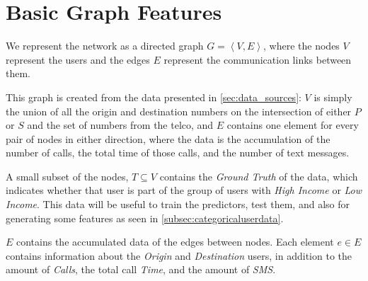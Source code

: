 \section{Basic Graph Features}
\label{sec:graphfeatures}

We represent the network as a directed graph $G = \left< V, E \right>$, where the nodes $V$ represent the users and the edges $E$ represent the communication links between them.

This graph is created from the data presented in \cref{sec:data_sources}: $V$ is simply the union of all the origin and destination numbers on the intersection of either $P$ or $S$ and the set of numbers from the telco, and $E$ contains one element for every pair of nodes in either direction, where the data is the accumulation of the number of calls, the total time of those calls, and the number of text messages.


A small subset of the nodes, $T \subseteq V$ contains the \emph{Ground Truth} of the data, which indicates whether that user is part of the group of users with \emph{High Income} or \emph{Low Income}. This data will be useful to train the predictors, test them, and also for generating some features as seen in \cref{subsec:categoricaluserdata}.

$E$ contains the accumulated data of the edges between nodes. Each element $e \in E$ contains information about the \emph{Origin} and \emph{Destination} users, in addition to the amount of \emph{Calls}, the total call \emph{Time}, and the amount of \emph{SMS}.
